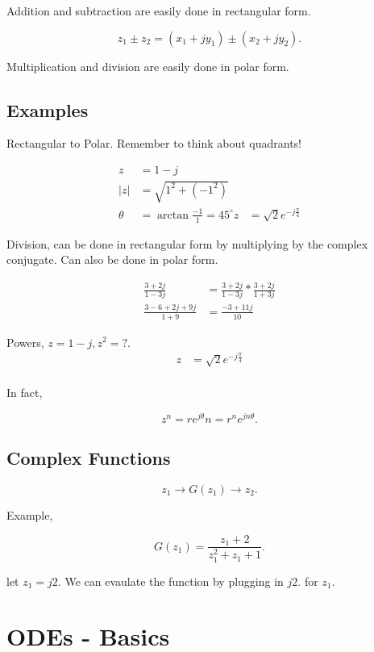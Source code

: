 \documentclass[12pt, a4paper]{report}
\begin{document}
  Addition and subtraction are easily done in rectangular form.

  \[
      z_{1} \pm z_{2} = \left( x_1 + jy_1 \right) \pm \left( x_2 + jy_2 \right)
    .\]

  \noindent
  Multiplication and division are easily done in polar form.


  \subsection{Examples}

  Rectangular to Polar. Remember to think about quadrants!

  \begin{align}
    z &= 1 - j \\
    |z| &= \sqrt{1 ^2 + (-1 ^2)} \\
    \theta &= \arctan{\frac{-1}{1}} = 45^{\circ}
    z &= \sqrt{2} e^{-j \frac{\pi}{4}}
  \end{align}

  Division, can be done in rectangular form by multiplying by the complex conjugate. Can also be done in polar form.

  \begin{align}
    \frac{3 + 2j}{1 - 3j} &= \frac{3 + 2j}{1 - 3j} * \frac{3 + 2j}{1 + 3j} \\
    \frac{3 - 6 + 2j + 9j}{1 + 9} &= \frac{-3 + 11j}{10}
  \end{align}

  Powers, $ z = 1 - j, z ^2 = ?. $
  \begin{align}
    z &= \sqrt{2}e^{-j \frac{\pi}{4}} \\
  \end{align}

  In fact,

  \[
      z^n = re^{j\theta}n = r^n e^{jn\theta}
    .\]

  \subsection{Complex Functions}

  \[
      z_1 \rightarrow G(z_1) \rightarrow z_2
    .\]

  Example,

  \[
      G(z_1) = \frac{z_1 + 2}{z_1^2 + z_1 + 1}
    .\]

  let $z_1 = j2$. We can evaulate the function by plugging in $ j2. $ for $ z_1. $

  \section{ODEs - Basics}
\end{document}
